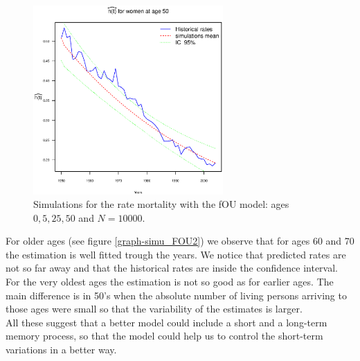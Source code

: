 \documentclass[smallextended]{svjour3}
\begin{document}
\begin{figure}[t]
    \includegraphics[width = 2.85in]{PlotWomen50.eps}
    \caption{Simulations for the rate mortality with the fOU model: ages
    $0,5,25,50$ and $N=10000$.}
    \label{graph-simu_FOU1}
\end{figure}



For older ages (see figure \ref{graph-simu_FOU2}) we observe that for ages 60
and 70 the estimation is well fitted trough the years. We notice that
predicted rates are not so far away and that the historical rates are inside
the confidence interval. For the very oldest ages the estimation is not so good
as for earlier ages. The main difference is in 50's when the absolute number of
living persons arriving to those ages were small so that the variability of the
estimates is larger. \\

All these suggest that a better model could include a short and a long-term
memory process, so that the model could help us to control the short-term
variations in a better way.
\end{document}
